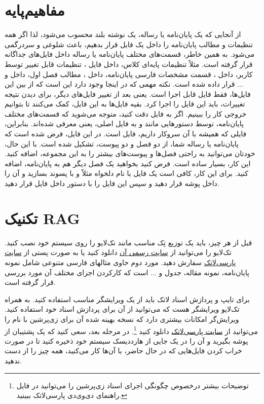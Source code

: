 \section{مفاهیم‌پایه}\label{sec2}
از آنجایی که یک پایان‌نامه یا رساله، یک نوشته بلند محسوب می‌شود، لذا اگر همه تنظیمات و مطالب پایان‌نامه را داخل یک فایل قرار بدهیم، باعث شلوغی
و سردرگمی می‌شود. به همین خاطر، قسمت‌های مختلف پایان‌نامه یا رساله  داخل فایل‌های جداگانه قرار گرفته است. مثلاً تنظیمات پایه‌ای کلاس، داخل فایل
، 
تنظیمات قابل تغییر توسط کاربر، داخل 
،
قسمت مشخصات فارسی پایان‌نامه، داخل 
،
مطالب فصل اول، داخل 
و ... قرار داده شده است. نکته مهمی که در اینجا وجود دارد این است که از بین این  فایل‌ها، فقط فایل 
قابل اجرا است. یعنی بعد از تغییر فایل‌های دیگر، برای دیدن نتیجه تغییرات، باید این فایل را اجرا کرد. بقیه فایل‌ها به این فایل، کمک می‌کنند تا بتوانیم خروجی کار را ببینیم. اگر به فایل 
دقت کنید، متوجه می‌شوید که قسمت‌های مختلف پایان‌نامه، توسط دستورهایی مانند 
و
به فایل اصلی، یعنی 
معرفی شده‌اند. بنابراین، فایلی که همیشه با آن سروکار داریم، فایل 
است.
در این فایل، فرض شده است که پایان‌نامه یا رساله شما، از دو فصل و دو پیوست، تشکیل شده است. با این حال، خودتان می‌توانید به راحتی فصل‌ها و پیوست‌های بیشتر را به این مجموعه، اضافه کنید. این کار، بسیار ساده است. فرض کنید بخواهید یک فصل دیگر هم به پایان‌نامه، اضافه کنید. برای این کار، کافی است یک فایل با نام دلخواه مثلاً 
و با پسوند 
بسازید و آن را داخل پوشه 
قرار دهید و سپس این فایل را با دستور 
\verb!!
داخل فایل
 قرار دهید.

\section{تکنیک RAG}
قبل از هر چیز، باید یک توزیع تِک مناسب مانند تک‌لایو
را روی سیستم خود نصب کنید. تک‌لایو  را می‌توانید از 
 \href{http://www.tug.org/texlive}{سایت رسمی آن}%
 دانلود کنید یا به صورت پستی از 
 \href{http://www.parsilatex.com}{سایت پارسی‌لاتک}%
سفارش دهید. مورد دوم حاوی مثالهای فارسی متنوعی شامل نمونه پایان‌نامه، نمونه مقاله، جدول و ... است که کارکردن اجزای مختلف آن مورد بررسی قرار گرفته است.

برای تایپ و پردازش اسناد لاتک باید از یک ویرایشگر مناسب استفاده کنید. به همراه تک‌لایو ویرایشگر  هست که می‌توانید از آن برای پردازش اسناد خود استفاده کنید. 
ویرایش‌گر 
امکانات بیشتری دارد که نسخه بهینه شده آن برای زی‌پرشین با نام   را می‌توانید  از 
 \href{http://www.parsilatex.com}{سایت پارسی‌لاتک} 
 دانلود کنید
 \footnote{توضیحات بیشتر درخصوص چگونگی اجرای اسناد زی‌پرشین را می‌توانید در فایل راهنمای دی‌وی‌دی پارسی‌لاتک ببینید.}.
در مرحله بعد، سعی کنید که  یک پشتیبان از پوشه 
 بگیرید و آن را در یک جایی از هارددیسک سیستم خود ذخیره کنید تا در صورت خراب کردن فایل‌هایی که در حال حاضر، با آن‌ها کار می‌کنید، همه چیز را از 
 دست ندهید.
 

